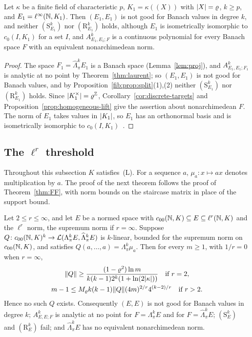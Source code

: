 \begin{corollary}\label{obs:cor:linf}
Let $\kappa$ be a finite field of characteristic $p$, $K_1=\kappa((X))$ with $\lvert X\rvert=\varrho$, $k\ge p$, and
$E_1=\ell^\infty(\mathbb N,K_1)$. Then $(E_1,E_1)$ is not good for Banach values in degree $k$, and neither $(\mathrm S^k_{E_1})$ nor
$(\mathrm R^k_{E_1})$ holds, although $E_1$ is isometrically isomorphic to $c_0(I,K_1)$ for a set $I$, and
$A^k_{E_1,E_1;F}$ is a continuous polynomial for every Banach space $F$ with an equivalent nonarchimedean norm.
\end{corollary}

\begin{proof}
The space $F_1=\widehat\Lambda^k_\pi E_1$ is a Banach space (Lemma~\ref{lem:proj}), and $A^k_{E_1,E_1;F_1}$ is analytic
at no point by Theorem~\ref{thm:laurent}; so $(E_1,E_1)$ is not good for Banach values, and by
Proposition~\ref{fib:prop:split}(1),(2) neither $(\mathrm S^k_{E_1})$ nor $(\mathrm R^k_{E_1})$ holds. Since
$\lvert K_1^\times\rvert=\varrho^\mathbb Z$, Corollary~\ref{cor:discrete-targets} and Proposition~\ref{prop:homogeneous-lift} give the
assertion about nonarchimedean $F$. The norm of $E_1$ takes values in $\lvert K_1\rvert$, so $E_1$ has an orthonormal basis and
is isometrically isomorphic to $c_0(I,K_1)$~\cite[\S1, Prop.~1]{Se}.
\end{proof}

\subsection{The \texorpdfstring{$\ell^r$}{l\textasciicircum r} threshold}\label{fib:ssec:local}
Throughout this subsection $K$ satisfies~\textup{(L)}. For a sequence $a$, $\mu_a\colon x\mapsto ax$ denotes
multiplication by $a$. The proof of the next theorem follows the proof of Theorem~\ref{thm:FF}, with norm bounds on the
staircase matrix in place of the support bound.

\begin{theorem}\label{fib:thm:ell2}
Let $2\le r\le\infty$, and let $E$ be a normed space with $c_{00}(\mathbb N,K)\subseteq E\subseteq\ell^r(\mathbb N,K)$ and the
$\ell^r$ norm, the supremum norm if $r=\infty$. Suppose $Q\colon c_{00}(\mathbb N,K)^k\to\mathcal L(\Lambda^k_\pi E,\widehat\Lambda^k_\pi E)$
is $k$\nobreakdash-linear, bounded for the supremum norm on $c_{00}(\mathbb N,K)$, and satisfies $Q(a,\dots,a)=\Lambda^k_\pi\mu_a$.
Then for every $m\ge1$, with $1/r=0$ when $r=\infty$,
\begin{equation}\label{fib:eq:quant}
 \begin{gathered}
 \lVert Q\rVert\ge\frac{(1-\varrho^2)\ln m}{k(k-1)2^k(1+\ln(2\lvert \kappa\rvert))}\quad\text{if }r=2,\\
 m-1\le M_\varrho k(k-1)\lVert Q\rVert(4m)^{2/r}4^{(k-2)/r}\quad\text{if }r>2.
 \end{gathered}
\end{equation}
Hence no such $Q$ exists. Consequently $(E,E)$ is not good for Banach values in degree $k$; $A^k_{E,E;F}$ is analytic at
no point for $F=\Lambda^k_\pi E$ and for $F=\widehat\Lambda^k_\pi E$; $(\mathrm S^k_E)$ and $(\mathrm R^k_E)$ fail; and
$\widehat\Lambda^k_\pi E$ has no equivalent nonarchimedean norm.
\end{theorem}

